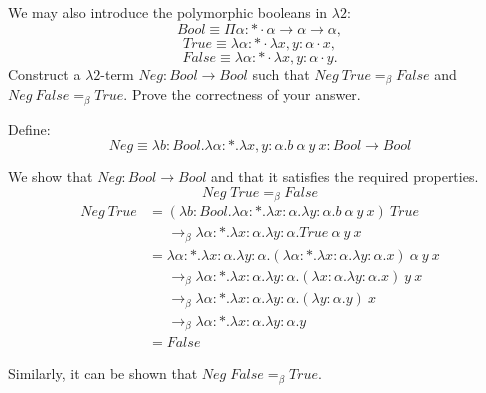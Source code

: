 \begin{problem}{3.14}
    We may also introduce the polymorphic booleans in $\lambda 2$:
    $$\mathit{Bool} \equiv \Pi\alpha:* \cdot \alpha\rightarrow\alpha\rightarrow\alpha,$$
    $$\mathit{True} \equiv \lambda\alpha:* \cdot \lambda x,y:\alpha \cdot x,$$
    $$\mathit{False} \equiv \lambda\alpha:* \cdot \lambda x,y:\alpha \cdot y.$$
    Construct a $\lambda 2$-term $\mathit{Neg}:\mathit{Bool}\to \mathit{Bool}$ such that $\mathit{Neg}\ \mathit{True}=_\beta \mathit{False}$ and $\mathit{Neg}\ \mathit{False}=_\beta \mathit{True}$. Prove the correctness of your answer.
\end{problem}

\begin{solution}
    Define: $$ Neg \equiv \lambda b : Bool . \lambda \alpha : * . \lambda x, y : \alpha . b\ \alpha\ y\ x : Bool \to Bool $$

We show that $Neg : Bool \rightarrow Bool$ and that it satisfies the required properties.
    $$Neg \; True =_\beta False$$
\begin{align*}
Neg\ True 
&= (\lambda b : Bool . \lambda \alpha : * . \lambda x : \alpha . \lambda y : \alpha . b\ \alpha\ y\ x)\ True \\[6pt]
&\;\;\;\;\;\rightarrow_\beta \lambda \alpha : * . \lambda x : \alpha . \lambda y : \alpha . True\ \alpha\ y\ x \\[6pt]
&= \lambda \alpha : * . \lambda x : \alpha . \lambda y : \alpha . (\lambda \alpha : * . \lambda x : \alpha . \lambda y : \alpha . x)\ \alpha\ y\ x \\[6pt]
&\;\;\;\;\;\rightarrow_\beta \lambda \alpha : * . \lambda x : \alpha . \lambda y : \alpha . (\lambda x : \alpha . \lambda y : \alpha . x)\ y\ x \\[6pt]
&\;\;\;\;\;\rightarrow_\beta \lambda \alpha : * . \lambda x : \alpha . \lambda y : \alpha . (\lambda y : \alpha . y)\ x \\[6pt]
&\;\;\;\;\;\rightarrow_\beta \lambda \alpha : * . \lambda x : \alpha . \lambda y : \alpha . y \\[6pt]
&= False
\end{align*}

Similarly, it can be shown that $Neg \; False =_\beta True$.
\end{solution}